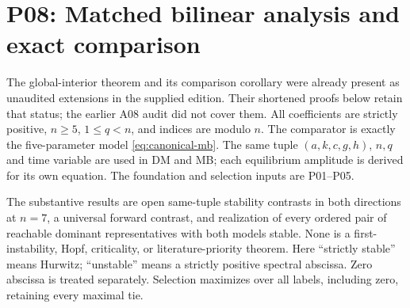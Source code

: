 \section{P08: Matched bilinear analysis and exact comparison}
\label{sec:P08}

The global-interior theorem and its comparison corollary were already
present as unaudited extensions in the supplied edition. Their shortened
proofs below retain that status; the earlier A08 audit did not cover them.
All coefficients are strictly positive, $n\ge5$, $1\le q<n$, and indices
are modulo $n$. The comparator is exactly the five-parameter model
\eqref{eq:canonical-mb}. The same tuple $(a,k,c,g,h)$, $n,q$ and time
variable are used in DM and MB; each equilibrium amplitude is derived
for its own equation. The foundation and selection inputs are P01--P05.

The substantive results are open same-tuple stability contrasts in both
directions at $n=7$, a universal forward contrast, and realization of
every ordered pair of reachable dominant representatives with both
models stable. None is a first-instability, Hopf, criticality, or
literature-priority theorem. Here ``strictly stable'' means Hurwitz;
``unstable'' means a strictly positive spectral abscissa. Zero abscissa
is treated separately. Selection maximizes over all labels, including
zero, retaining every maximal tie.


